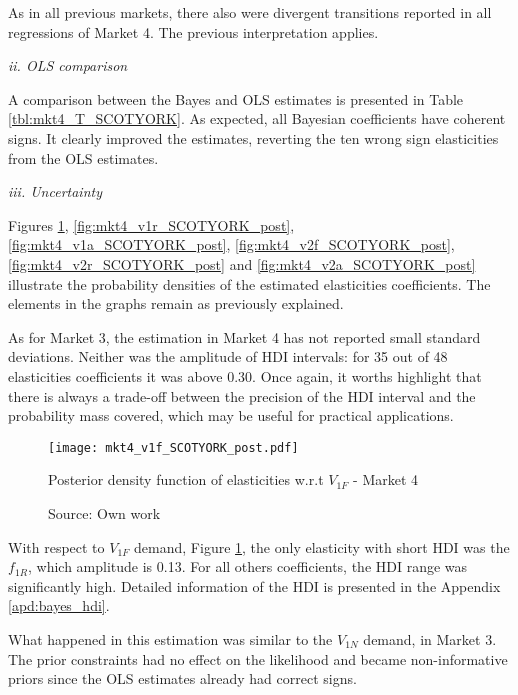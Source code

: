 As in all previous markets, there also were divergent transitions reported in all regressions of Market 4. The previous interpretation applies.



\vspace{-2em}
\textit{ii. OLS comparison}

A comparison between the Bayes and OLS estimates is presented in Table \ref{tbl:mkt4_T_SCOTYORK}. As expected, all Bayesian coefficients have coherent signs. It clearly improved the estimates, reverting the ten wrong sign elasticities from the OLS estimates.

\begin{landscape}

\end{landscape}

\textit{iii. Uncertainty}

Figures \ref{fig:mkt4_v1f_SCOTYORK_post}, \ref{fig:mkt4_v1r_SCOTYORK_post}, \ref{fig:mkt4_v1a_SCOTYORK_post}, \ref{fig:mkt4_v2f_SCOTYORK_post}, \ref{fig:mkt4_v2r_SCOTYORK_post} and \ref{fig:mkt4_v2a_SCOTYORK_post} illustrate the probability densities of the estimated elasticities coefficients. The elements in the graphs remain as previously explained. 

As for Market 3, the estimation in Market 4 has not reported small standard deviations. Neither was the amplitude of HDI intervals: for 35 out of 48 elasticities coefficients it was above 0.30. Once again, it worths highlight that there is always a trade-off between the precision of the HDI interval and the probability mass covered, which may be useful for practical applications.

\begin{figure}[H]
\centering
\texttt{[image: mkt4\_v1f\_SCOTYORK\_post.pdf]}
\caption{Posterior density function of elasticities w.r.t $V_{1F}$ - Market 4}
\label{fig:mkt4_v1f_SCOTYORK_post}
\caption*{Source: Own work}
\end{figure} 

With respect to $V_{1F}$ demand, Figure \ref{fig:mkt4_v1f_SCOTYORK_post}, the only elasticity with short HDI was the $f_{1R}$, which amplitude is 0.13. For all others coefficients, the HDI range was significantly high. Detailed information of the HDI is presented in the Appendix \ref{apd:bayes_hdi}. 

What happened in this estimation was similar to the $V_{1N}$ demand, in Market 3. The prior constraints had no effect on the likelihood and became non-informative priors since the OLS estimates already had correct signs. 

